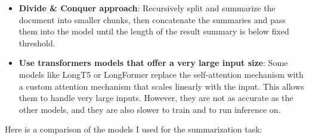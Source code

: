 \begin{itemize}
    \item \textbf{Divide \& Conquer approach}: Recursively split and summarize the document into smaller chunks, then concatenate the summaries and pass them into the model until the length of the result summary is below fixed threshold.

    \item \textbf{Use transformers models that offer a very large input size}: Some models like LongT5 or LongFormer replace the self-attention mechanism with a custom attention mechanism that scales linearly with the input. This allows them to handle very large inputs. However, they are not as accurate as the other models, and they are also slower to train and to run inference on.
\end{itemize}

Here is a comparison of the models I used for the summarization task:

